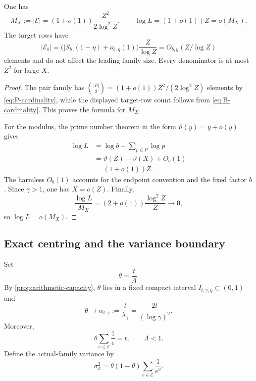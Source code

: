 \begin{proposition}
\label{prop:family-size-modulus}
One has
\begin{equation}
\label{eq:family-size-modulus}
 M_X:=|\mathcal E|
 =(1+o(1))\frac{Z^2}{2\log^2Z},
 \qquad
 \log L=(1+o(1))Z=o(M_X).
\end{equation}
The target rows have
\[
 |\mathcal E_b|
 =\bigl(|S_b|(1-\eta)+o_{b,\eta}(1)\bigr)\frac{Z}{\log Z}
 =O_{b,\eta}(Z/\log Z)
\]
elements and do not affect the leading family size.  Every denominator is at most $Z^2$ for large $X$.
\end{proposition}

\begin{proof}
The pair family has $\binom{|P|}{2}=(1+o(1))Z^2/(2\log^2Z)$ elements by \cref{eq:P-cardinality}, while the displayed target-row count follows from \cref{eq:B-cardinality}.  This proves the formula for $M_X$.

For the modulus, the prime number theorem in the form $\vartheta(y)=y+o(y)$ gives
\begin{align*}
 \log L
 &=\log b+\sum_{p\in P}\log p\\
 &=\vartheta(Z)-\vartheta(X)+O_b(1)\\
 &=(1+o(1))Z.
\end{align*}
The harmless $O_b(1)$ accounts for the endpoint convention and the fixed factor $b$.  Since $\gamma>1$, one has $X=o(Z)$.  Finally,
\[
 \frac{\log L}{M_X}
 =(2+o(1))\frac{\log^2Z}{Z}\longrightarrow0,
\]
so $\log L=o(M_X)$.
\end{proof}

\subsection{Exact centring and the variance boundary}

Set
\begin{equation}
\label{eq:theta-definition}
 \theta=\frac{t}{\Lambda}.
\end{equation}
By \cref{prop:arithmetic-capacity}, $\theta$ lies in a fixed compact interval $I_{t,\gamma,\eta}\subset(0,1)$ and
\begin{equation}
\label{eq:theta-limit}
 \theta\longrightarrow
 \alpha_{t,\gamma}
 :=\frac{t}{\lambda_\gamma}
 =\frac{2t}{(\log\gamma)^2}.
\end{equation}
Moreover,
\begin{equation}
\label{eq:exact-centering-load}
 \theta\sum_{e\in\mathcal E}\frac1e=t,
 \qquad
 \Lambda<1.
\end{equation}
Define the actual-family variance by
\begin{equation}
\label{eq:sigma-E}
 \sigma_{\mathcal E}^2
 =\theta(1-\theta)\sum_{e\in\mathcal E}\frac1{e^2}.
\end{equation}

